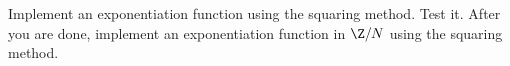   Implement an exponentiation function using the squaring method.
  Test it.
  After you are done, implement an exponentiation function in $\Z/N$
  using the squaring method.
